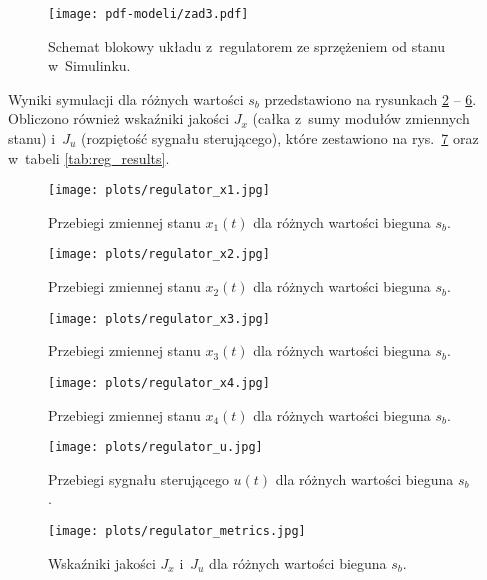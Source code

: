 \documentclass[a4paper,titlepage,11pt,floatssmall]{mwrep} %
\begin{document}
\begin{figure}[H]
    \centering
    \texttt{[image: pdf-modeli/zad3.pdf]} %
    \caption{Schemat blokowy układu z~regulatorem ze sprzężeniem od stanu w~Simulinku.}
    \label{rys:regulator_simulink}
\end{figure}

Wyniki symulacji dla różnych wartości $s_b$ przedstawiono na rysunkach \ref{rys:reg_x1} -- \ref{rys:reg_u}. Obliczono również wskaźniki jakości $J_x$ (całka z~sumy modułów zmiennych stanu) i~$J_u$ (rozpiętość sygnału sterującego), które zestawiono na rys.~\ref{rys:reg_metrics} oraz w~tabeli \ref{tab:reg_results}.

\begin{figure}[H]
    \centering
    \texttt{[image: plots/regulator\_x1.jpg]}
    \caption{Przebiegi zmiennej stanu $x_1(t)$ dla różnych wartości bieguna $s_b$.}
    \label{rys:reg_x1}
\end{figure}

\begin{figure}[H]
    \centering
    \texttt{[image: plots/regulator\_x2.jpg]}
    \caption{Przebiegi zmiennej stanu $x_2(t)$ dla różnych wartości bieguna $s_b$.}
    \label{rys:reg_x2}
\end{figure}

\begin{figure}[H]
    \centering
    \texttt{[image: plots/regulator\_x3.jpg]}
    \caption{Przebiegi zmiennej stanu $x_3(t)$ dla różnych wartości bieguna $s_b$.}
    \label{rys:reg_x3}
\end{figure}

\begin{figure}[H]
    \centering
    \texttt{[image: plots/regulator\_x4.jpg]}
    \caption{Przebiegi zmiennej stanu $x_4(t)$ dla różnych wartości bieguna $s_b$.}
    \label{rys:reg_x4}
\end{figure}

\begin{figure}[H]
    \centering
    \texttt{[image: plots/regulator\_u.jpg]}
    \caption{Przebiegi sygnału sterującego $u(t)$ dla różnych wartości bieguna $s_b$.}
    \label{rys:reg_u}
\end{figure}

\begin{figure}[H]
    \centering
    \texttt{[image: plots/regulator\_metrics.jpg]}
    \caption{Wskaźniki jakości $J_x$ i~$J_u$ dla różnych wartości bieguna $s_b$.}
    \label{rys:reg_metrics}
\end{figure}
\end{document}
